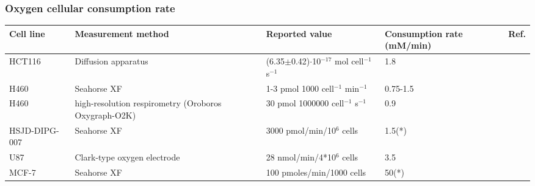 \documentclass[11pt,a4paper]{article}
\begin{document}

 
 
 
 
 
\subsubsection{Oxygen cellular consumption rate}

\begin{table}[h!]
\begin{center}
\begin{tabular}{ |p{18mm}|p{26mm}|p{30mm}|p{25mm}|p{7mm}| }
 \hline

 \textbf{Cell line}  & \textbf{Measurement method} & Reported  value & \textbf{Consumption rate} (mM/min)  & Ref. \\
 \hline
 HCT116 & Diffusion apparatus & (6.35$\pm$0.42)$\cdot$10$^{-17}$ mol cell$^{-1}$ s$^{-1}$& 1.8 & \cite{Mao2018}\\
 \hline
  H460 & Seahorse XF &  1-3 pmol 1000 cell$^{-1}$ min$^{-1}$& 0.75-1.5 & \cite{Jiang2016}\\
 \hline
   H460 & high-resolution respirometry (Oroboros Oxygraph-O2K) &  30 pmol 1000000 cell$^{-1}$ s$^{-1}$& 0.9 & \cite{Amoedo2011}\\
 \hline
   HSJD-DIPG-007 &  Seahorse XF & 3000 pmol/min/10$^6$ cells & 1.5(*) & \cite{Shen2020}\\
 \hline
   U87 &  Clark-type oxygen electrode & 28 nmol/min/4*10$^6$ cells & 3.5 & \cite{Zhou2011}\\
 \hline
    MCF-7 &  Seahorse XF & 100 pmoles/min/1000 cells & 50(*) & \cite{Zhuang2014}\\
 \hline

 
 \end{tabular}
 \end{center}
 \end{table}
\end{document}
